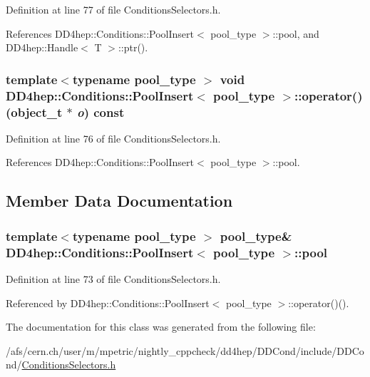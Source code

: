 Definition at line 77 of file ConditionsSelectors.h.

References DD4hep::Conditions::PoolInsert$<$ pool\_\-type $>$::pool, and DD4hep::Handle$<$ T $>$::ptr().\hypertarget{class_d_d4hep_1_1_conditions_1_1_pool_insert_a5919829f7463342dc0eb77f32d2b4efa}{
\subsubsection[{operator()}]{\setlength{\rightskip}{0pt plus 5cm}template$<$typename pool\_\-type $>$ void {\bf DD4hep::Conditions::PoolInsert}$<$ pool\_\-type $>$::operator() ({\bf object\_\-t} $\ast$ {\em o}) const}}
\label{class_d_d4hep_1_1_conditions_1_1_pool_insert_a5919829f7463342dc0eb77f32d2b4efa}


Definition at line 76 of file ConditionsSelectors.h.

References DD4hep::Conditions::PoolInsert$<$ pool\_\-type $>$::pool.

\subsection{Member Data Documentation}
\hypertarget{class_d_d4hep_1_1_conditions_1_1_pool_insert_aba19eeaf8d2e0a226176234c454c6213}{
\subsubsection[{pool}]{\setlength{\rightskip}{0pt plus 5cm}template$<$typename pool\_\-type $>$ pool\_\-type\& {\bf DD4hep::Conditions::PoolInsert}$<$ pool\_\-type $>$::{\bf pool}}}
\label{class_d_d4hep_1_1_conditions_1_1_pool_insert_aba19eeaf8d2e0a226176234c454c6213}


Definition at line 73 of file ConditionsSelectors.h.

Referenced by DD4hep::Conditions::PoolInsert$<$ pool\_\-type $>$::operator()().

The documentation for this class was generated from the following file:\begin{DoxyCompactItemize}
\item 
/afs/cern.ch/user/m/mpetric/nightly\_\-cppcheck/dd4hep/DDCond/include/DDCond/\hyperlink{_conditions_selectors_8h}{ConditionsSelectors.h}\end{DoxyCompactItemize}
